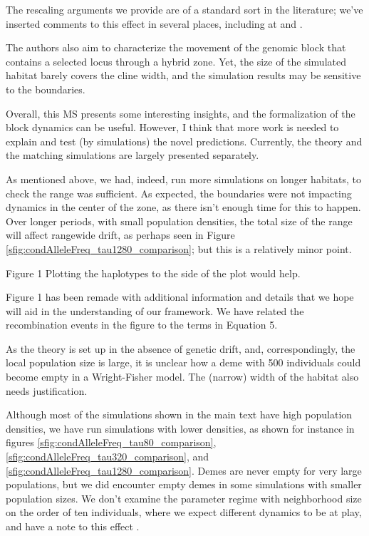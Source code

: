 The rescaling arguments we provide are of a standard sort in the literature;
we've inserted comments to this effect in several places, including at  and .


\begin{point}{}
    The authors also aim to characterize the movement of the genomic block that contains a selected locus through a hybrid zone. Yet, the size of the simulated habitat barely covers the cline width, and the simulation results may be sensitive to the boundaries.

Overall, this MS presents some interesting insights, and the formalization of the block dynamics can be useful. However, I think that more work is needed to explain and test (by simulations) the novel predictions. Currently, the theory and the matching simulations are largely presented separately.
\end{point}

\reply
As mentioned above, we had, indeed, run more simulations on longer habitats, to check the range was sufficient.
As expected, the boundaries were not impacting dynamics in the center of the zone, as there isn't enough time for this to happen.
Over longer periods, with small population densities, the total size of the range will affect rangewide drift,
as perhaps seen in Figure \ref{sfig:condAlleleFreq_tau1280_comparison}; 
but this is a relatively minor point.

\begin{point}{Figure 1}
 Plotting the haplotypes to the side of the plot would help.
\end{point}

\reply
Figure 1 has been remade with additional information and details that we hope will aid in the understanding of our framework. We have related the recombination events in the figure to the terms in Equation 5. 


\begin{point}{\revref}
 As the theory is set up in the absence of genetic drift, and, correspondingly, the local population size is large, it is unclear how a deme with 500 individuals could become empty in a Wright-Fisher model.  The (narrow) width of the habitat also needs justification.
\end{point}

\reply
Although most of the simulations shown in the main text have high population densities,
we have run simulations with lower densities, 
as shown for instance in figures \ref{sfig:condAlleleFreq_tau80_comparison}, \ref{sfig:condAlleleFreq_tau320_comparison}, and \ref{sfig:condAlleleFreq_tau1280_comparison}.
Demes are never empty for very large populations, but
we did encounter empty demes in some simulations with smaller population sizes.
We don't examine the parameter regime with neighborhood size on the order of ten individuals,
where we expect different dynamics to be at play,
and have a note to this effect .

